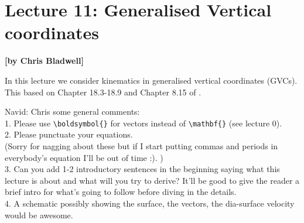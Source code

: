 
\section{Lecture 11: Generalised Vertical coordinates}
\begin{flushright}\textbf{[by Chris Bladwell]}\end{flushright}

In this lecture we consider kinematics in generalised vertical coordinates (GVCs). This based on Chapter 18.3-18.9 and Chapter 8.15 of \cite{Griffies2019}.

{\color{red}Navid: Chris some general comments:\\
1. Please use \verb"\boldsymbol{}" for vectors instead of \verb"\mathbf{}" (see lecture 0).\\
2. Please punctuate your equations.\\
(Sorry for nagging about these but if I start putting commas and periods in everybody's equation I'll be out of time :). )\\
3. Can you add 1-2 introductory sentences in the beginning saying what this lecture is about and what will you try to derive? It'll be good to give the reader a brief intro for what's going to follow before diving in the details.\\
4. A schematic possibly showing the surface, the vectors, the dia-surface velocity would be awesome.}

